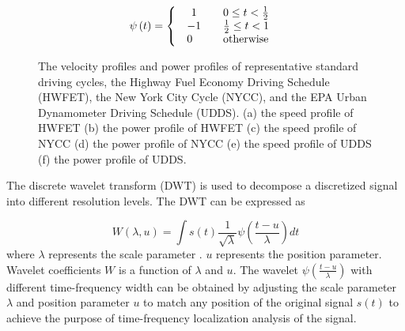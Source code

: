\documentclass[energies,article,submit,moreauthors,pdftex,10pt,a4paper]{Definitions/mdpi}
\begin{document}
\begin{equation}
\psi \left( t \right) = \left\{ {\begin{array}{*{20}{c}}
{1{\rm{       }}}&{0 \le t < \frac{1}{2}}\\
\begin{array}{l}
 - 1{\rm{ }}\\
0
\end{array}&\begin{array}{l}
\frac{1}{2} \le t < 1\\
{\rm{otherwise}}
\end{array}
\end{array}} \right.
\end{equation}

\begin{figure}[ht]
\centering  %
\caption{The velocity profiles and power profiles of representative standard driving cycles,  the Highway Fuel Economy Driving Schedule (HWFET), the New York City Cycle (NYCC), and the EPA Urban Dynamometer Driving Schedule (UDDS). (a) the speed profile of HWFET (b) the power profile of HWFET (c) the speed profile of NYCC (d) the power profile of NYCC (e)  the speed profile of UDDS (f) the power profile of UDDS.}
\label{3drivingcycle}
\end{figure}

The discrete wavelet transform (DWT) is used to decompose a discretized signal
into different resolution levels. The DWT can be expressed as

\begin{equation}
W\left( {\lambda ,u} \right) = \int {s\left( t \right)} \frac{1}{{\sqrt \lambda  }}\psi \left( {\frac{{t - u}}{\lambda }} \right)dt
\end{equation}
where $\lambda$ represents the scale parameter . $u$ represents the position parameter. Wavelet coefficients $W$ is a function of $\lambda$  and $u$. The wavelet $\psi \left( {\frac{{t - u}}{\lambda }} \right)$ with different time-frequency width can be obtained by adjusting the scale parameter $\lambda$ and position parameter $u$ to match any position of the original signal $s\left( t \right)$ to achieve the purpose of time-frequency localization analysis of the signal.
\end{document}
